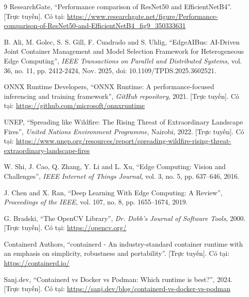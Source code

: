 \documentclass[12pt,a4paper]{report}
\begin{document}
\begin{thebibliography}{9}
ResearchGate,
``Performance comparison of ResNet50 and EfficientNetB4''.
[Trực tuyến]. Có tại: \url{https://www.researchgate.net/figure/Performance-comparison-of-ResNet50-and-EfficientNetB4_fig9_350333631}

B. Ali, M. Golec, S. S. Gill, F. Cuadrado and S. Uhlig,
``EdgeAIBus: AI-Driven Joint Container Management and Model Selection Framework for Heterogeneous Edge Computing'',
\emph{IEEE Transactions on Parallel and Distributed Systems}, vol. 36, no. 11, pp. 2412-2424, Nov. 2025, doi: 10.1109/TPDS.2025.3602521.

ONNX Runtime Developers,
``ONNX Runtime: A performance-focused inferencing and training framework'',
\emph{GitHub repository}, 2021. [Trực tuyến]. Có tại: \url{https://github.com/microsoft/onnxruntime}

UNEP,
``Spreading like Wildfire: The Rising Threat of Extraordinary Landscape Fires'',
\emph{United Nations Environment Programme}, Nairobi, 2022. [Trực tuyến]. Có tại: \url{https://www.unep.org/resources/report/spreading-wildfire-rising-threat-extraordinary-landscape-fires}

W. Shi, J. Cao, Q. Zhang, Y. Li and L. Xu,
``Edge Computing: Vision and Challenges'',
\emph{IEEE Internet of Things Journal}, vol. 3, no. 5, pp. 637--646, 2016.

J. Chen and X. Ran,
``Deep Learning With Edge Computing: A Review'',
\emph{Proceedings of the IEEE}, vol. 107, no. 8, pp. 1655--1674, 2019.

G. Bradski,
``The OpenCV Library'',
\emph{Dr. Dobb's Journal of Software Tools}, 2000. [Trực tuyến]. Có tại: \url{https://opencv.org/}

Containerd Authors,
``containerd - An industry-standard container runtime with an emphasis on simplicity, robustness and portability''.
[Trực tuyến]. Có tại: \url{https://containerd.io/}

Sanj.dev,
``Containerd vs Docker vs Podman: Which runtime is best?'', 2024.
[Trực tuyến]. Có tại: \url{https://sanj.dev/blog/containerd-vs-docker-vs-podman}

\end{thebibliography}
\end{document}
